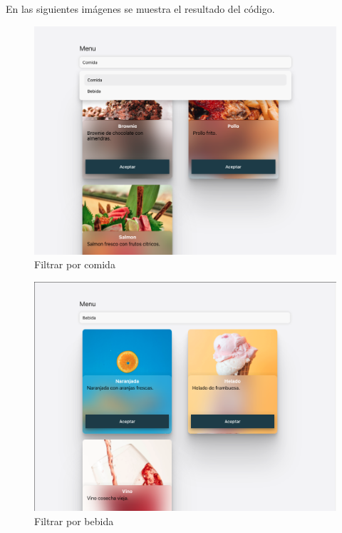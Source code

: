 En las siguientes imágenes se muestra el resultado del código.
\newline
\begin{figure}[H]
    \includegraphics[width=1\textwidth]{./Imagenes/9.13.png}
   \centering 
    \caption[Filtrar por comida]{Filtrar por comida}
    \end{figure}
\newline

\newline
\begin{figure}[H]
    \includegraphics[width=1\textwidth]{./Imagenes/9.14.png}
   \centering 
    \caption[Filtrar por bebida]{Filtrar por bebida}
    \end{figure}
\newline

